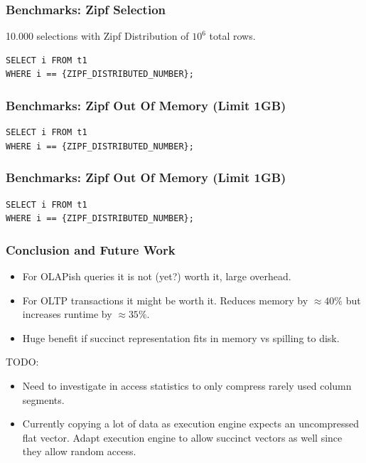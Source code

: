 \documentclass{beamer}
\begin{document}
\begin{frame}[fragile]
    \frametitle{Benchmarks: Zipf Selection}
10.000 selections with Zipf Distribution of $10^6$ total rows.

\begin{lstlisting}[style=SQL]
SELECT i FROM t1 
WHERE i == {ZIPF_DISTRIBUTED_NUMBER};
\end{lstlisting}
    

\end{frame}

\begin{frame}[fragile]
    \frametitle{Benchmarks: Zipf Out Of Memory (Limit 1GB)}
\begin{lstlisting}[style=SQL]
SELECT i FROM t1 
WHERE i == {ZIPF_DISTRIBUTED_NUMBER};
\end{lstlisting}
    

\end{frame}


\begin{frame}[fragile]
    \frametitle{Benchmarks: Zipf Out Of Memory (Limit 1GB)}
\begin{lstlisting}[style=SQL]
SELECT i FROM t1 
WHERE i == {ZIPF_DISTRIBUTED_NUMBER};
\end{lstlisting}
    

\end{frame}


\begin{frame}
    \frametitle{Conclusion and Future Work}

    \begin{itemize}
        \item For OLAPish queries it is not (yet?) worth it, large overhead.
        \item For OLTP transactions it might be worth it. Reduces memory by $\approx 40\%$ but increases runtime by $\approx 35\%$.
        \item Huge benefit if succinct representation fits in memory vs spilling to disk.
    \end{itemize}

    \vspace{0.5cm}
    \pause

    TODO:
    \begin{itemize}
        \item Need to investigate in access statistics to only compress rarely used column segments.
        \item Currently copying a lot of data as execution engine expects an uncompressed flat vector. Adapt execution engine to allow 
        succinct vectors as well since they allow random access. 
    \end{itemize}
\end{frame}
\end{document}
